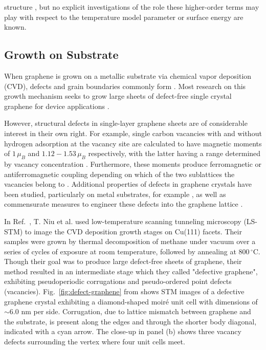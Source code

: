 structure \cite{wu2010phasefieldcrystal-7c4, wu2010controlling-fda, greenwood2011phasefieldcrystal-889}, but no explicit investigations of the role these higher-order terms may play with respect to the temperature model parameter or surface energy are known.

\subsection{Growth on Substrate}

When graphene is grown on a metallic substrate via chemical vapor deposition (CVD), defects and grain boundaries commonly form \cite{huang2011grains-9dd, yu2011control-6aa, song2012origin-9f6}.  Most research on this growth mechanism seeks to grow large sheets of defect-free single crystal graphene for device applications \cite{dai2011rational-807, kim2009largescale-cc6, sun2010growth-dd9}.

However, structural defects in single-layer graphene sheets are of considerable interest in their own right.  For example, single carbon vacancies with and without hydrogen adsorption at the vacancy site are calculated to have magnetic moments of $1\,\mu_B$ and $1.12-1.53\,\mu_B$ respectively, with the latter having a range determined by vacancy concentration \cite{yazyev2007defectinduced-c22}.  Furthermore, these moments produce ferromagnetic or antiferromagnetic coupling depending on which of the two sublattices the vacancies belong to \cite{yazyev2007defectinduced-c22}.  Additional properties of defects in graphene crystals have been studied, particularly on metal substrates, for example \cite{ugeda2011point-033, lahiri2010extended-120}, as well as commensurate measures to engineer these defects into the graphene lattice \cite{lahiri2010extended-120}.  

In Ref.~\cite{niu2013growth-4f5}, T. Niu et al. used low-temperature scanning tunneling microscopy (LS-STM) to image the CVD deposition growth stages on Cu(111) facets.  Their samples were grown by thermal decomposition of methane under vacuum over a series of cycles of exposure at room temperature, followed by annealing at $800\,^\circ$C.  Though their goal was to produce large defect-free sheets of graphene, their method resulted in an intermediate stage which they called "defective graphene", exhibiting pseudoperiodic corrugations and pseudo-ordered point defects (vacancies).  Fig.~\ref{fig:defect-graphene} from \cite{niu2013growth-4f5} shows STM images of a defective graphene crystal exhibiting a diamond-shaped moir\'e unit cell with dimensions of $\sim6.0$ nm per side.  Corrugation, due to lattice mismatch between graphene and the substrate, is present along the edges and through the shorter body diagonal, indicated with a cyan arrow.  The close-up in panel (b) shows three vacancy defects surrounding the vertex where four unit cells meet.

